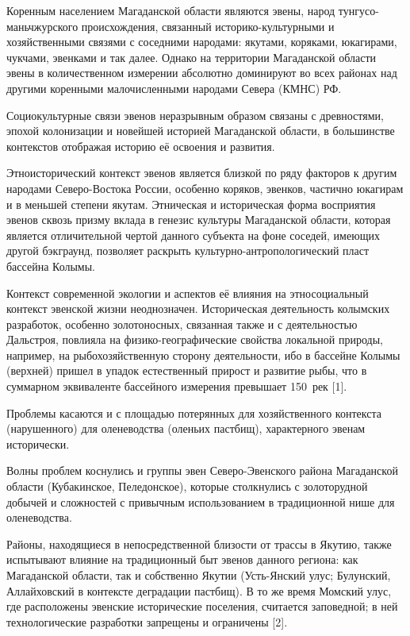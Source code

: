  

\makeProcTitleRazdel
{}


Коренным населением Магаданской области являются эвены, народ тунгусо-маньчжурского происхождения, связанный историко-культурными и хозяйственными связями с соседними народами: якутами, коряками, юкагирами, чукчами, эвенками и так далее. Однако на территории Магаданской области эвены в количественном измерении абсолютно доминируют во всех районах над другими коренными малочисленными народами Севера (КМНС) РФ.

     Социокультурные связи эвенов неразрывным образом связаны с древностями, эпохой колонизации и новейшей историей Магаданской области, в большинстве контекстов отображая историю её освоения и развития.

     Этноисторический контекст эвенов является близкой по ряду факторов к другим народами Северо-Востока России, особенно коряков, эвенков, частично юкагирам и в меньшей степени якутам. Этническая и историческая форма восприятия эвенов сквозь призму вклада в генезис культуры Магаданской области, которая является отличительной чертой данного субъекта на фоне соседей, имеющих другой бэкграунд, позволяет раскрыть культурно-антропологический пласт бассейна Колымы.

      Контекст современной экологии и аспектов её влияния на этносоциальный контекст эвенской жизни неоднозначен. Историческая деятельность колымских разработок, особенно золотоносных, связанная также и с деятельностью Дальстроя, повлияла на физико-географические свойства локальной природы, например, на рыбохозяйственную сторону деятельности, ибо в бассейне Колымы (верхней) пришел в упадок естественный прирост и развитие рыбы, что в суммарном эквиваленте бассейного измерения превышает 150~рек [1].

      Проблемы касаются и с площадью потерянных для хозяйственного контекста (нарушенного) для оленеводства (оленьих пастбищ), характерного эвенам исторически.

      Волны проблем коснулись и группы эвен Северо-Эвенского района Магаданской области (Кубакинское, Пеледонское), которые столкнулись с золоторудной добычей и сложностей с привычным использованием в традиционной нише для оленеводства.

      Районы, находящиеся в непосредственной близости от трассы в Якутию, также испытывают влияние на традиционный быт эвенов данного региона: как Магаданской области, так и собственно Якутии (Усть-Янский улус; Булунский, Аллайховский в контексте деградации пастбищ). В то же время Момский улус, где расположены эвенские исторические поселения, считается заповедной; в ней технологические разработки запрещены и ограничены [2].

